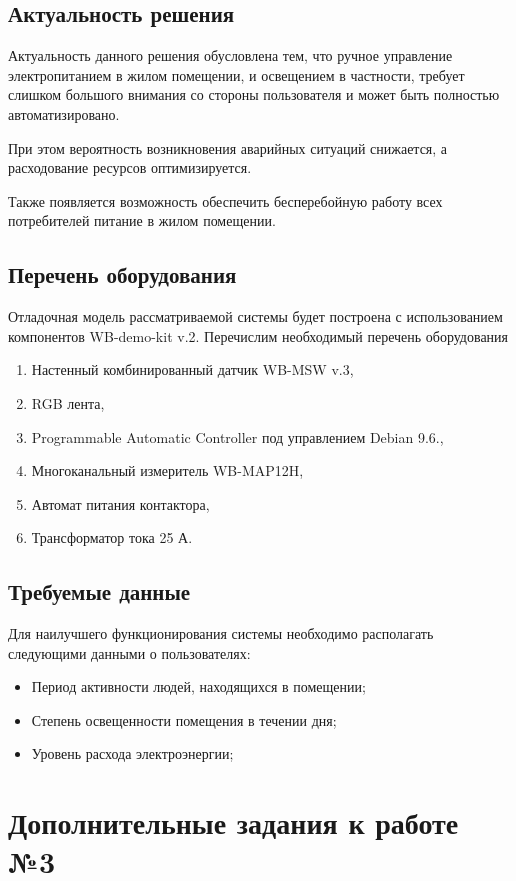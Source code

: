 \documentclass[a4paper,14pt]{extarticle}
\begin{document}
\subsection{Актуальность решения}
Актуальность данного решения обусловлена тем, что ручное управление электропитанием в жилом помещении, и освещением в частности, требует слишком большого внимания со стороны пользователя и может быть полностью автоматизировано.

При этом вероятность возникновения аварийных ситуаций снижается, а расходование ресурсов оптимизируется.

Также появляется возможность обеспечить бесперебойную работу всех потребителей питание в жилом помещении.

\subsection{Перечень оборудования}
Отладочная модель рассматриваемой системы будет построена с использованием компонентов WB-demo-kit v.2. Перечислим необходимый перечень оборудования
\begin{enumerate}
	\item Настенный комбинированный датчик WB-MSW v.3,
	\item RGB лента,
	\item Programmable Automatic Controller под управлением Debian 9.6.,
	\item Многоканальный измеритель WB-MAP12H,
	\item Автомат питания контактора,
	\item Трансформатор тока 25 А.
\end{enumerate}

\subsection{Требуемые данные} 
Для наилучшего функционирования системы необходимо располагать следующими данными о пользователях:
\begin{itemize}
	\item Период активности людей, находящихся в помещении;
	\item Степень освещенности помещения в течении дня;
	\item Уровень расхода электроэнергии;
\end{itemize}
\newpage
\section{Дополнительные задания к работе №3}
\end{document}
